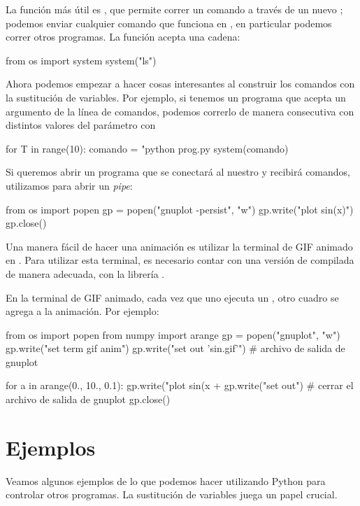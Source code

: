 La función más útil es , que permite correr un comando a través de un nuevo ; podemos enviar cualquier comando que funciona en , en particular podemos correr otros programas. La función acepta una cadena:
\begin{python}
from os import system
system("ls")
\end{python}

Ahora podemos empezar a hacer cosas interesantes al construir los comandos con la sustitución de variables. Por ejemplo, si tenemos un programa  que acepta un argumento de la línea de comandos, podemos correrlo de manera consecutiva con distintos valores del parámetro con
\begin{python}
for T in range(10):
  comando = "python prog.py %
  system(comando)
\end{python}

Si queremos abrir un programa que se conectará al nuestro y recibirá comandos, utilizamos  para abrir un \emph{pipe}:
\begin{python}
from os import popen
gp = popen("gnuplot -persist", "w")
gp.write("plot sin(x)\n")
gp.close()
\end{python}

Una manera fácil de hacer una animación es utilizar la terminal de GIF animado en . Para utilizar esta terminal, es necesario contar con una versión de  compilada de manera adecuada, con la librería .

En la terminal de GIF animado, cada vez que uno ejecuta un , otro cuadro se agrega a la animación. Por ejemplo:
\begin{python}
from os import popen
from numpy import arange
gp = popen("gnuplot", "w")
gp.write("set term gif anim\n")
gp.write("set out 'sin.gif'\n")	# archivo de salida de gnuplot

for a in arange(0., 10., 0.1):
  gp.write("plot sin(x + %
gp.write("set out\n")	# cerrar el archivo de salida de gnuplot
gp.close()
\end{python}


\section{Ejemplos}

Veamos algunos ejemplos de lo que podemos hacer utilizando Python para controlar otros programas. 
La sustitución de variables juega un papel crucial.

